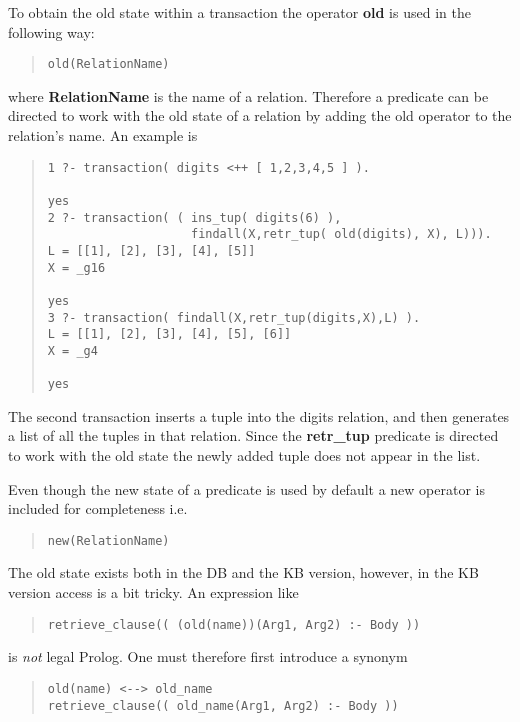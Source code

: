 To obtain the old state within a transaction the operator {\bf old} is
used in the following way:
\begin{quote}\begin{verbatim}
old(RelationName)
\end{verbatim}\end{quote}
where {\bf RelationName} is the name of a relation.
Therefore a predicate can be directed to work with the
old state of a relation by adding the old operator
to the relation's name.  An example is

\begin{quote}\begin{verbatim}
1 ?- transaction( digits <++ [ 1,2,3,4,5 ] ).

yes
2 ?- transaction( ( ins_tup( digits(6) ), 
                    findall(X,retr_tup( old(digits), X), L))).
L = [[1], [2], [3], [4], [5]]
X = _g16

yes
3 ?- transaction( findall(X,retr_tup(digits,X),L) ).
L = [[1], [2], [3], [4], [5], [6]]
X = _g4

yes
\end{verbatim}\end{quote}
The second transaction inserts a tuple into the digits relation, 
and then generates a list of all the tuples in that relation.
Since the {\bf retr\_tup} predicate is directed to work with the old
state the newly added tuple does not appear in the list.


Even though the new state of a predicate is used by default a 
new operator is included for completeness i.e.
\begin{quote}\begin{verbatim}
new(RelationName)
\end{verbatim}\end{quote}
The old state exists both in the DB and the KB version, however, in
the KB version access is a bit tricky. An expression like
\begin{quote}\begin{verbatim}
retrieve_clause(( (old(name))(Arg1, Arg2) :- Body ))
\end{verbatim}\end{quote}
is {\em not} legal Prolog. One must therefore first introduce a synonym
\begin{quote}\begin{verbatim}
old(name) <--> old_name
retrieve_clause(( old_name(Arg1, Arg2) :- Body ))
\end{verbatim}\end{quote}

